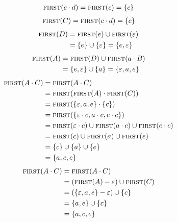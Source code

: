 \documentclass{report}
\newcommand{\Null}{\varepsilon}
\newcommand{\Seq}{\cdot}
\newcommand{\FIRST}{\textsc{first}}
\newcommand{\NT}[1]{{#1}}
\newcommand{\T}[1]{{#1}}
\begin{document}
      \begin{align*}
        \FIRST(\T{c} \Seq \T{d}) &= \FIRST(\T{c}) = \{\T{c}\} \\
      \end{align*}
      \begin{align*}
        \FIRST(\NT{C}) &= \FIRST(\T{c} \Seq \T{d}) = \{\T{c}\} \\
      \end{align*}
      \begin{align*}
        \FIRST(\NT{D}) &= \FIRST(\T{e}) \cup \FIRST(\Null) \\
        &= \{\T{e}\} \cup \{\Null\} = \{\T{e}, \Null\} \\
      \end{align*}
      \begin{align*}
        \FIRST(\NT{A}) &= \FIRST(\NT{D}) \cup \FIRST(\T{a} \Seq \NT{B}) \\
        &= \{\T{e}, \Null\} \cup \{\T{a}\} = \{\Null, \T{a}, \T{e}\} \\
      \end{align*}
      \begin{align*}
        \FIRST(\NT{A} \Seq \NT{C}) &= \FIRST(\NT{A} \Seq \NT{C}) \\
        &= \FIRST(\FIRST(\NT{A}) \Seq \FIRST(\NT{C})) \\
        &= \FIRST(\{\Null, \T{a}, \T{e}\} \Seq \{\T{c}\})\\
        &= \FIRST(\{\Null \Seq \T{c}, \T{a} \Seq \T{c}, \T{e} \Seq \T{c}\})\\
        &= \FIRST(\Null \Seq \T{c}) \cup \FIRST(\T{a} \Seq \T{c}) \cup \FIRST(\T{e} \Seq \T{c}) \\
        &= \FIRST(\T{c}) \cup \FIRST(\T{a}) \cup \FIRST(\T{e}) \\
        &= \{\T{c}\} \cup \{\T{a}\} \cup \{\T{e}\} \\
        &= \{\T{a}, \T{c}, \T{e}\}\\
      \end{align*}
      \begin{align*}
        \FIRST(\NT{A} \Seq \NT{C}) &= \FIRST(\NT{A} \Seq \NT{C}) \\
        &= (\FIRST(\NT{A}) - \Null) \cup \FIRST(\NT{C}) \\
        &= (\{\Null, \T{a}, \T{e}\} - \Null) \cup \{\T{c}\} \\
        &= \{\T{a}, \T{e}\} \cup \{\T{c}\}\\
        &= \{\T{a}, \T{c}, \T{e}\}\\
      \end{align*}
\end{document}
